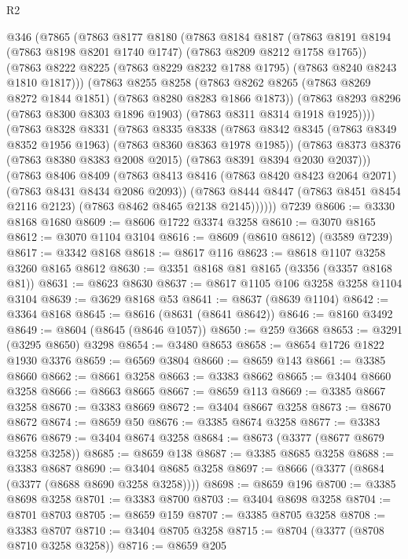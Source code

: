 \begin{lexlean}{R2}
\begin{coremodule}
    @346
      (@7865
        (@7863
          @8177
          @8180
          (@7863
            @8184
            @8187
            (@7863 @8191 @8194 (@7863 @8198 @8201 @1740 @1747) (@7863 @8209 @8212 @1758 @1765))
            (@7863 @8222 @8225 (@7863 @8229 @8232 @1788 @1795) (@7863 @8240 @8243 @1810 @1817)))
          (@7863
            @8255
            @8258
            (@7863 @8262 @8265 (@7863 @8269 @8272 @1844 @1851) (@7863 @8280 @8283 @1866 @1873))
            (@7863 @8293 @8296 (@7863 @8300 @8303 @1896 @1903) (@7863 @8311 @8314 @1918 @1925))))
        (@7863
          @8328
          @8331
          (@7863
            @8335
            @8338
            (@7863 @8342 @8345 (@7863 @8349 @8352 @1956 @1963) (@7863 @8360 @8363 @1978 @1985))
            (@7863 @8373 @8376 (@7863 @8380 @8383 @2008 @2015) (@7863 @8391 @8394 @2030 @2037)))
          (@7863
            @8406
            @8409
            (@7863 @8413 @8416 (@7863 @8420 @8423 @2064 @2071) (@7863 @8431 @8434 @2086 @2093))
            (@7863 @8444 @8447 (@7863 @8451 @8454 @2116 @2123) (@7863 @8462 @8465 @2138 @2145))))))
    @7239
@8606 := @3330 @8168 @1680
@8609 := @8606 @1722 @3374 @3258
@8610 := @3070 @8165
@8612 := @3070 @1104 @3104
@8616 := @8609 (@8610 @8612) (@3589 @7239)
@8617 := @3342 @8168
@8618 := @8617 @116
@8623 := @8618 @1107 @3258 @3260 @8165 @8612
@8630 := @3351 @8168 @81 @8165 (@3356 (@3357 @8168 @81))
@8631 := @8623 @8630
@8637 := @8617 @1105 @106 @3258 @3258 @1104 @3104
@8639 := @3629 @8168 @53
@8641 := @8637 (@8639 @1104)
@8642 := @3364 @8168
@8645 := @8616 (@8631 (@8641 @8642))
@8646 := @8160 @3492
@8649 := @8604 (@8645 (@8646 @1057))
@8650 := @259 @3668
@8653 := @3291 (@3295 @8650) @3298
@8654 := @3480 @8653
@8658 := @8654 @1726 @1822 @1930 @3376
@8659 := @6569 @3804
@8660 := @8659 @143
@8661 := @3385 @8660
@8662 := @8661 @3258
@8663 := @3383 @8662
@8665 := @3404 @8660 @3258
@8666 := @8663 @8665
@8667 := @8659 @113
@8669 := @3385 @8667 @3258
@8670 := @3383 @8669
@8672 := @3404 @8667 @3258
@8673 := @8670 @8672
@8674 := @8659 @50
@8676 := @3385 @8674 @3258
@8677 := @3383 @8676
@8679 := @3404 @8674 @3258
@8684 := @8673 (@3377 (@8677 @8679 @3258 @3258))
@8685 := @8659 @138
@8687 := @3385 @8685 @3258
@8688 := @3383 @8687
@8690 := @3404 @8685 @3258
@8697 := @8666 (@3377 (@8684 (@3377 (@8688 @8690 @3258 @3258))))
@8698 := @8659 @196
@8700 := @3385 @8698 @3258
@8701 := @3383 @8700
@8703 := @3404 @8698 @3258
@8704 := @8701 @8703
@8705 := @8659 @159
@8707 := @3385 @8705 @3258
@8708 := @3383 @8707
@8710 := @3404 @8705 @3258
@8715 := @8704 (@3377 (@8708 @8710 @3258 @3258))
@8716 := @8659 @205

\end{coremodule}
\end{lexlean}
